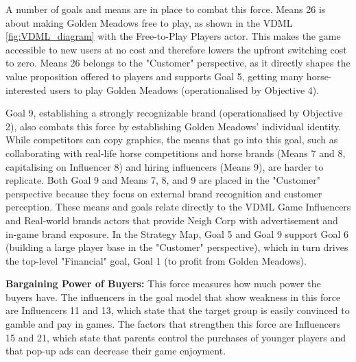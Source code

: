 \documentclass{article}
\begin{document}
A number of goals and means are in place to combat this force. Means 26 is about making Golden Meadows free to play, as shown in the VDML \autoref{fig:VDML_diagram} with the Free-to-Play Players actor. This makes the game accessible to new users at no cost and therefore lowers the upfront switching cost to zero. Means 26 belongs to the "Customer" perspective, as it directly shapes the value proposition offered to players and supports Goal 5, getting many horse-interested users to play Golden Meadows (operationalised by Objective 4).

Goal 9, establishing a strongly recognizable brand (operationalised by Objective 2), also combats this force by establishing Golden Meadows' individual identity. While competitors can copy graphics, the means that go into this goal, such as collaborating with real-life horse competitions and horse brands (Means 7 and 8, capitalising on Influencer 8) and hiring influencers (Means 9), are harder to replicate. Both Goal 9 and Means 7, 8, and 9 are placed in the "Customer" perspective because they focus on external brand recognition and customer perception. These means and goals relate directly to the VDML Game Influencers and Real-world brands actors that provide Neigh Corp with advertisement and in-game brand exposure. In the Strategy Map, Goal 5 and Goal 9 support Goal 6 (building a large player base in the "Customer" perspective), which in turn drives the top-level "Financial" goal, Goal 1 (to profit from Golden Meadows).

\textbf{Bargaining Power of Buyers:}
This force measures how much power the buyers have. The influencers in the goal model that show weakness in this force are Influencers 11 and 13, which state that the target group is easily convinced to gamble and pay in games. The factors that strengthen this force are Influencers 15 and 21, which state that parents control the purchases of younger players and that pop-up ads can decrease their game enjoyment.
\end{document}
